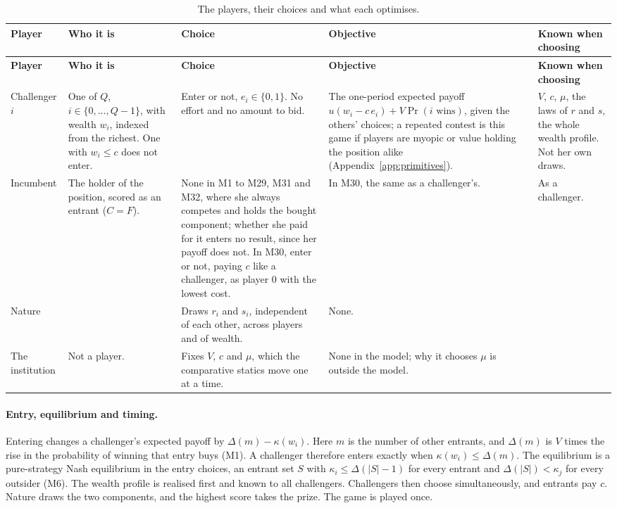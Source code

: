\footnotesize
\begin{longtable}{@{}P{1.8cm}P{3.8cm}P{2.8cm}P{3.8cm}P{3.3cm}@{}}
\caption{The players, their choices and what each optimises.}\label{tab:players}\\
\toprule
\textbf{Player} & \textbf{Who it is} & \textbf{Choice} & \textbf{Objective} & \textbf{Known when choosing} \\
\midrule
\endfirsthead
\toprule
\textbf{Player} & \textbf{Who it is} & \textbf{Choice} & \textbf{Objective} & \textbf{Known when choosing} \\
\midrule
\endhead
\bottomrule
\endfoot
Challenger $i$ & One of $Q$, $i\in\{0,\dots,Q-1\}$, with wealth $w_i$, indexed
  from the richest. One with $w_i\le c$ does not enter. & Enter or not,
  $e_i\in\{0,1\}$. No effort and no amount to bid. & The one-period expected
  payoff $u(w_i-c\,e_i)+V\Pr(i\text{ wins})$, given the others' choices; a
  repeated contest is this game if players are myopic or value holding the
  position alike (Appendix~\ref{app:primitives}). & $V$, $c$,
  $\mu$, the laws of $r$ and $s$, the whole wealth profile. Not her own
  draws. \\ \addlinespace
Incumbent & The holder of the position, scored as an entrant ($C=F$). & None in
  M1 to M29, M31 and M32, where she always competes and holds the bought
  component; whether she paid for it enters no result, since her payoff does
  not. In M30, enter or not, paying $c$ like a challenger, as player $0$ with
  the lowest cost. & In M30, the same as a challenger's. & As a challenger. \\ \addlinespace
Nature & & Draws $r_i$ and $s_i$, independent of each other, across players
  and of wealth. & None. & \\ \addlinespace
The institution & Not a player. & Fixes $V$, $c$ and $\mu$, which the
  comparative statics move one at a time. & None in the model; why it chooses
  $\mu$ is outside the model. & \\
\end{longtable}
\normalsize

\paragraph{Entry, equilibrium and timing.} Entering changes a challenger's
expected payoff by $\Delta(m)-\kappa(w_i)$. Here $m$ is the number of other
entrants, and $\Delta(m)$ is $V$ times the rise in the probability of winning
that entry buys (M1). A challenger therefore enters exactly when
$\kappa(w_i)\le\Delta(m)$. The equilibrium is a pure-strategy Nash equilibrium
in the entry choices, an entrant set $S$ with $\kappa_i\le\Delta(|S|-1)$ for
every entrant and $\Delta(|S|)<\kappa_j$ for every outsider (M6). The wealth
profile is realised first and known to all challengers. Challengers then choose
simultaneously, and entrants pay $c$. Nature draws the two components, and the
highest score takes the prize. The game is played once.

